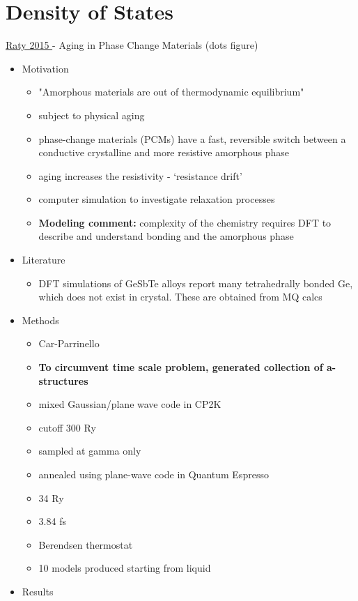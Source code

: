 \documentclass[3p,review,12pt]{elsarticle}
\begin{document}
\section{Density of States}
\underline{Raty 2015 \cite{Raty2015}} - Aging in Phase Change Materials (dots figure)
\par
\begin{itemize}
	\item Motivation
	\begin{itemize}
		\item "Amorphous materials are out of thermodynamic equilibrium"
		\item subject to physical aging
		\item phase-change materials (PCMs) have a fast, reversible switch between a conductive crystalline and more resistive amorphous phase
		\item aging increases the resistivity - `resistance drift'
		\item computer simulation to investigate relaxation processes
		\item \textbf{Modeling comment:} complexity of the chemistry requires DFT to describe and understand bonding and the amorphous phase
	\end{itemize}
	\item Literature
	\begin{itemize}
		\item DFT simulations of GeSbTe alloys report many tetrahedrally bonded Ge, which does not exist in crystal. These are obtained from MQ calcs
	\end{itemize}
	\item Methods
	\begin{itemize}
		\item Car-Parrinello
		\item \textbf{To circumvent time scale problem, generated collection of a-structures}
		\item mixed Gaussian/plane wave code in CP2K
		\item cutoff 300 Ry
		\item sampled at gamma only
		\item annealed using plane-wave code in Quantum Espresso
		\item 34 Ry
		\item 3.84 fs
		\item Berendsen thermostat
		\item 10 models produced starting from liquid
	\end{itemize}	
 	\item Results

\end{itemize}
\end{document}
